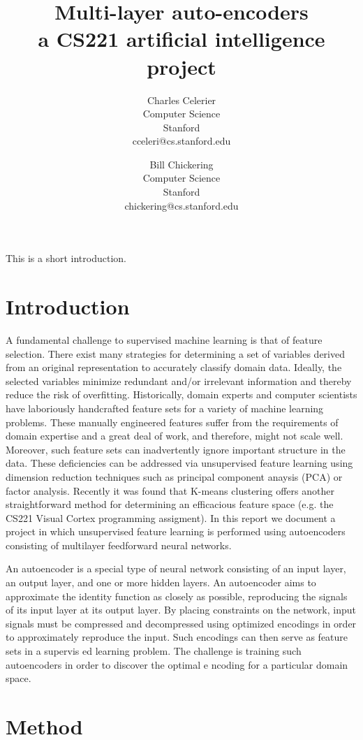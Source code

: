 \documentclass{article}
\title{Multi-layer auto-encoders \\
    \large{a CS221 artificial intelligence project}}
\author{
    Charles Celerier \\
    Computer Science \\
    Stanford \\
    cceleri@cs.stanford.edu
  \and
    Bill Chickering \\
    Computer Science \\
    Stanford \\
    chickering@cs.stanford.edu
}
\begin{document}
\maketitle

This is a short introduction.

\section{Introduction}\label{sec:introduction}

A fundamental challenge to supervised machine learning is that of feature
selection. There exist many strategies for determining a set of variables
derived from an original representation to accurately classify domain data.
Ideally, the selected variables minimize redundant and/or irrelevant information
and thereby reduce the risk of overfitting. Historically, domain experts and
computer scientists have laboriously handcrafted feature sets for a variety of
machine learning problems. These manually engineered features suffer from the
requirements of domain expertise and a great deal of work, and therefore, might
not scale well. Moreover, such feature sets can inadvertently ignore important
structure in the data. These deficiencies can be addressed via unsupervised
feature learning using dimension reduction techniques such as principal
component anaysis (PCA) or factor analysis. Recently it was found that K-means
clustering offers another straightforward method for determining an efficacious
feature space (e.g. the CS221 Visual Cortex programming assigment). In this
report we document a project in which unsupervised feature learning is performed
using autoencoders consisting of multilayer feedforward neural networks.

An autoencoder is a special type of neural network consisting of an input layer,
an output layer, and one or more hidden layers. An autoencoder aims to
approximate the identity function as closely as possible, reproducing the
signals of its input layer at its output layer. By placing constraints on the
network, input signals must be compressed and decompressed using optimized
encodings in order to approximately reproduce the input. Such encodings can then
serve as feature sets in a supervis ed learning problem. The challenge is
training such autoencoders in order to discover the optimal e ncoding for a
particular domain space.

\section{Method}\label{sec:method}
\end{document}
